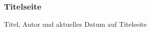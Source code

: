 \begin{frame}
    \frametitle{Titelseite}
    \begin{block}{Titel, Autor und aktuelles Datum auf Titelseite}
        
    \end{block}
\end{frame}
